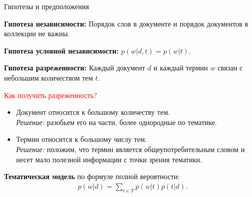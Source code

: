 \documentclass[unicode,9pt, pdf]{beamer}
\begin{document}
     
     \begin{frame}{Гипотезы и предположения}
     
     \textbf{Гипотеза независимости:} Порядок слов в документе и порядок документов в коллекции не важны.
     
     \vspace{0.4 cm}
     
     \textbf{Гипотеза условной независимости:} $p(w|d,t) = p(w|t)$.
     
     \vspace{0.4 cm}
     
     \textbf{Гипотеза разреженности:} Каждый документ $d$ и каждый термин $w$ связан с небольшим количеством тем $t$. 
     
      \vspace{0.2 cm}
      
     \textcolor{red}{Как получить разреженность?}
     \vspace{0.2 cm}
     
      \begin{itemize}
          \item Документ относится к большому количеству тем.\\
           \vspace{0.2 cm}
           \textit{Решение:} разобьем его на части, более однородные по тематике.
           \vspace{0.2 cm}
          \item Термин относится к большому числу тем.\\
            \vspace{0.2 cm}
            \textit{Решение:} положим, что термин является общеупотребительным словом и несет мало полезной информации с точки зрения тематики.

      \end{itemize}
     
      \vspace{0.4 cm}
      
     \textbf{Тематическая модель} по формуле полной вероятности:
     \begin{gather*}
        p(w|d) = \sum_{t \in T}p(w|t)p(t|d).
     \end{gather*}
    
    \end{frame}
 
\end{document}
